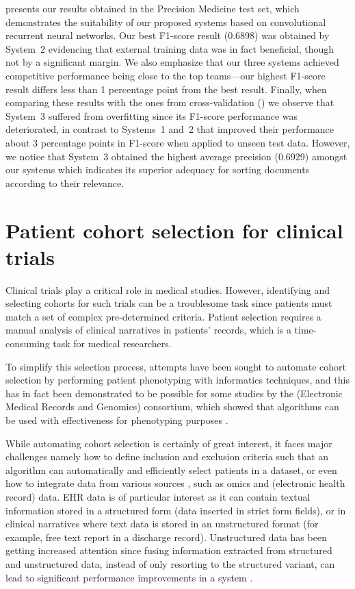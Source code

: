  presents our results obtained in the Precision Medicine test set, which demonstrates the suitability of our proposed systems based on convolutional recurrent neural networks.
Our best F1-score result (0.6898) was obtained by System~2 evidencing that external training data was in fact beneficial, though not by a significant margin.
We also emphasize that our three systems achieved competitive performance being close to the top teams---our highest F1-score result differs less than 1 percentage point from the best result.
Finally, when comparing these results with the ones from cross-validation () we observe that System~3 suffered from overfitting since its F1-score performance was deteriorated, in contrast to Systems~1 and~2 that improved their performance about 3 percentage points in F1-score when applied to unseen test data.
However, we notice that System~3 obtained the highest average precision (0.6929) amongst our systems which indicates its superior adequacy for sorting documents according to their relevance.


\section{Patient cohort selection for clinical trials}

Clinical trials play a critical role in medical studies.
However, identifying and selecting cohorts for such trials can be a troublesome task since patients must match a set of complex pre-determined criteria.
Patient selection requires a manual analysis of clinical narratives in patients' records, which is a time-consuming task for medical researchers.

To simplify this selection process, attempts have been sought to automate cohort selection by performing patient phenotyping with informatics techniques, and this has in fact been demonstrated to be possible for some studies by the  (Electronic Medical Records and Genomics) consortium, which showed that algorithms can be used with effectiveness for phenotyping purposes \parencite{pathak2013a}.

While automating cohort selection is certainly of great interest, it faces major challenges namely how to define inclusion and exclusion criteria such that an algorithm can automatically and efficiently select patients in a dataset, or even how to integrate data from various sources \parencite{pathak2013a}, such as omics and  (electronic health record) data.
EHR data is of particular interest as it can contain textual information stored in a structured form (data inserted in strict form fields), or in clinical narratives where text data is stored in an unstructured format (for example, free text report in a discharge record).
Unstructured data has been getting increased attention since fusing information extracted from structured and unstructured data, instead of only resorting to the structured variant, can lead to significant performance improvements in a system \parencite{ludvigsson2013a}.

